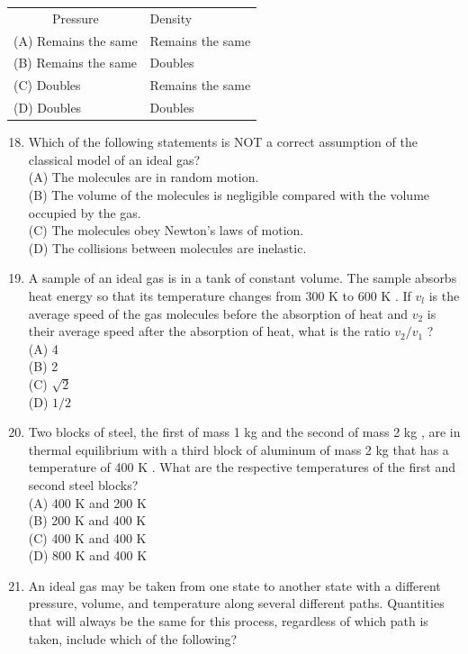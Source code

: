 \begin{enumerate}
\begin{center}
\begin{tabular}{ll}
\multicolumn{1}{c}{Pressure} & Density \\
(A) Remains the same & Remains the same \\
(B) Remains the same & Doubles \\
(C) Doubles & Remains the same \\
(D) Doubles & Doubles \\
\end{tabular}
\end{center}

\begin{enumerate}
  \setcounter{enumi}{17}
  \item Which of the following statements is NOT a correct assumption of the classical model of an ideal gas?\\
(A) The molecules are in random motion.\\
(B) The volume of the molecules is negligible compared with the volume occupied by the gas.\\
(C) The molecules obey Newton's laws of motion.\\
(D) The collisions between molecules are inelastic.
  \item A sample of an ideal gas is in a tank of constant volume. The sample absorbs heat energy so that its temperature changes from 300 K to 600 K . If $v_{l}$ is the average speed of the gas molecules before the absorption of heat and $v_{2}$ is their average speed after the absorption of heat, what is the ratio $v_{2} / v_{1}$ ?\\
(A) 4\\
(B) 2\\
(C) $\sqrt{2}$\\
(D) $1 / 2$
  \item Two blocks of steel, the first of mass 1 kg and the second of mass 2 kg , are in thermal equilibrium with a third block of aluminum of mass 2 kg that has a temperature of 400 K . What are the respective temperatures of the first and second steel blocks?\\
(A) 400 K and 200 K\\
(B) 200 K and 400 K\\
(C) 400 K and 400 K\\
(D) 800 K and 400 K
  \item An ideal gas may be taken from one state to another state with a different pressure, volume, and temperature along several different paths. Quantities that will always be the same for this process, regardless of which path is taken, include which of the following?\\

\end{enumerate}
\end{enumerate}
